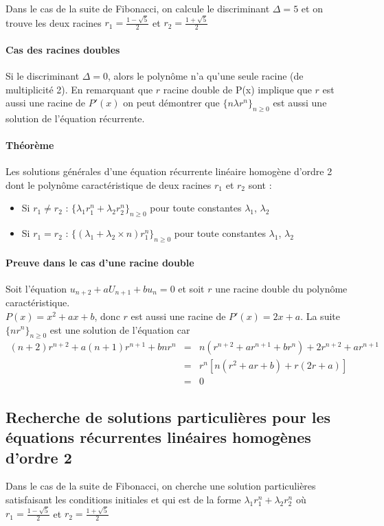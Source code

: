 	Dans le cas de la suite de Fibonacci, on calcule le discriminant $\Delta=5$ et on trouve les deux racines $r_1 = \frac{1-\sqrt{5}}{2}$ et 
	$r_2=\frac{1+\sqrt{5}}{2}$

	\paragraph{Cas des racines doubles} Si le discriminant $\Delta = 0$, alors le polynôme n'a qu'une seule racine (de multiplicité 2). En remarquant
	que $r$ racine double de P(x) implique que $r$ est aussi une racine de $P'(x)$ on peut démontrer que $\{n\lambda r^n\}_{n \geq 0}$ est aussi une
	solution de l'équation récurrente.

	\paragraph{Théorème} Les solutions générales d'une équation récurrente linéaire homogène d'ordre 2 dont le polynôme caractéristique de deux racines
	$r_1$ et $r_2$ sont :
	\begin{itemize}
		\item Si $r_1 \neq r_2$ : $\{ \lambda_1 r_1^n + \lambda_2 r_2^n\}_{n \geq 0}$ pour toute constantes $\lambda_1$, $\lambda_2$
		\item Si $r_1 = r_2$ :  $\{(\lambda_1 + \lambda_2 \times n)r_1^n\}_{n \geq 0}$ pour toute constantes $\lambda_1$, $\lambda_2$
	\end{itemize}

	\paragraph{Preuve dans le cas d'une racine double}
	Soit l'équation $u_{n+2} + a U_{n+1} + bu_n = 0$ et soit $r$ une racine double du polynôme caractéristique.\\  
	$P(x) = x^2 + ax + b$, donc $r$ est aussi une racine de $P'(x)= 2x+a$. La suite $\{nr^n\}_{n\geq 0}$ est une solution de l'équation car
	\begin{eqnarray*}
	(n+2)r^{n+2} + a(n+1)r^{n+1} + bnr^n &=& n(r^{n+2} + ar^{n+1} + br^n) + 2r^{n+2} + ar^{n+1}\\
	&=& r^n[n(r^2 + ar + b) + r(2r+a)]\\
	&=& 0
	\end{eqnarray*}
	\subsection{Recherche de solutions particulières pour les équations récurrentes linéaires homogènes d'ordre 2}
	Dans le cas de la suite de Fibonacci, on cherche une solution particulières satisfaisant les conditions initiales et qui est de la forme
	$\lambda_1r_1^n + \lambda_2r_2^n$ où $r_1 = \frac{1-\sqrt{5}}{2}$ et $r_2 = \frac{1+\sqrt{5}}{2}$

